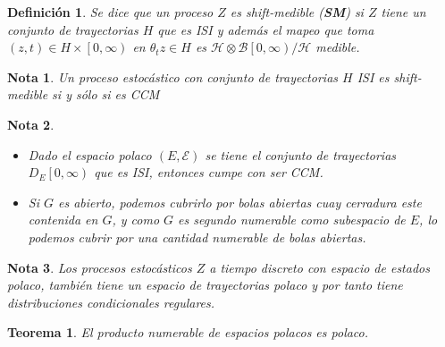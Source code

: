\documentclass{article}
\newtheorem{Def}{Definición}
\newtheorem{Teo}{Teorema}
\newtheorem{Note}{Nota}
\begin{document}
\begin{Def}
Se dice que un proceso $Z$ es shift-medible (\textbf{SM}) si $Z$ tiene un conjunto de trayectorias $H$ que es ISI y adem\'as el mapeo que toma $\left(z,t\right)\in H\times\left[0,\infty\right)$ en $\theta_{t}z\in H$ es $\mathcal{H}\otimes\mathcal{B}\left[0,\infty\right)/\mathcal{H}$ medible.
\end{Def}

\begin{Note}
Un proceso estoc\'astico con conjunto de trayectorias $H$ ISI es shift-medible si y s\'olo si es CCM
\end{Note}

\begin{Note}
\begin{itemize}
\item Dado el espacio polaco $\left(E,\mathcal{E}\right)$ se tiene el  conjunto de trayectorias $D_{E}\left[0,\infty\right)$ que es ISI, entonces cumpe con ser CCM.

\item Si $G$ es abierto, podemos cubrirlo por bolas abiertas cuay cerradura este contenida en $G$, y como $G$ es segundo numerable como subespacio de $E$, lo podemos cubrir por una cantidad numerable de bolas abiertas.

\end{itemize}
\end{Note}


\begin{Note}
Los procesos estoc\'asticos $Z$ a tiempo discreto con espacio de estados polaco, tambi\'en tiene un espacio de trayectorias polaco y por tanto tiene distribuciones condicionales regulares.
\end{Note}

\begin{Teo}
El producto numerable de espacios polacos es polaco.
\end{Teo}
\end{document}
